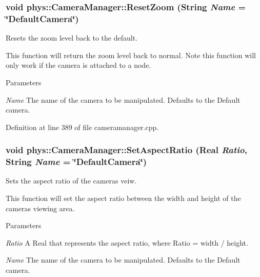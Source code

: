 \hypertarget{classphys_1_1CameraManager_a1cfaf4720fa9af7c0f234d6a2f26e179}{
\subsubsection[{ResetZoom}]{\setlength{\rightskip}{0pt plus 5cm}void phys::CameraManager::ResetZoom ({\bf String} {\em Name} = {\ttfamily \char`\"{}DefaultCamera\char`\"{}})}}
\label{d9/d91/classphys_1_1CameraManager_a1cfaf4720fa9af7c0f234d6a2f26e179}


Resets the zoom level back to the default. 

This function will return the zoom level back to normal. Note this function will only work if the camera is attached to a node. 
\begin{DoxyParams}{Parameters}
\item[{\em Name}]The name of the camera to be manipulated. Defaults to the Default camera. \end{DoxyParams}


Definition at line 389 of file cameramanager.cpp.

\hypertarget{classphys_1_1CameraManager_af16862039fffd900b9c7acc20527cac8}{
\subsubsection[{SetAspectRatio}]{\setlength{\rightskip}{0pt plus 5cm}void phys::CameraManager::SetAspectRatio ({\bf Real} {\em Ratio}, \/  {\bf String} {\em Name} = {\ttfamily \char`\"{}DefaultCamera\char`\"{}})}}
\label{d9/d91/classphys_1_1CameraManager_af16862039fffd900b9c7acc20527cac8}


Sets the aspect ratio of the cameras veiw. 

This function will set the aspect ratio between the width and height of the cameras viewing area. 
\begin{DoxyParams}{Parameters}
\item[{\em Ratio}]A Real that represents the aspect ratio, where Ratio = width / height. \item[{\em Name}]The name of the camera to be manipulated. Defaults to the Default camera. \end{DoxyParams}


